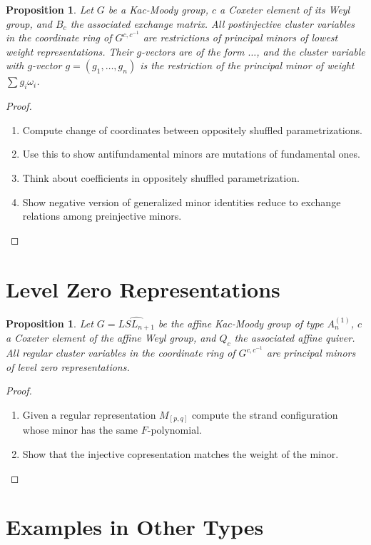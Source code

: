 \documentclass[11pt]{amsart}
\newtheorem{proposition}[theorem]{Proposition}
\begin{document}
\begin{proposition}
Let $G$ be a Kac-Moody group, $c$ a Coxeter element of its Weyl group, and $B_c$ the associated exchange matrix.  All postinjective cluster variables in the coordinate ring of $G^{c,c^{-1}}$ are restrictions of principal minors of lowest weight representations.  Their $g$-vectors are of the form $\dotsc$, and the cluster variable with $g$-vector $g = (g_1,\dotsc,g_n)$ is the restriction of the principal minor of weight $\sum g_i \omega_i$.
\end{proposition}
\begin{proof}
\begin{enumerate}
\item Compute change of coordinates between oppositely shuffled parametrizations.
\item Use this to show antifundamental minors are mutations of fundamental ones.
\item Think about coefficients in oppositely shuffled parametrization.
\item Show negative version of generalized minor identities reduce to exchange relations among preinjective minors.
\end{enumerate}
\end{proof}

\section{Level Zero Representations}

\begin{proposition}
Let $G = \widehat{LSL_{n+1}}$ be the affine Kac-Moody group of type $A_n^{(1)}$, $c$ a Coxeter element of the affine Weyl group, and $Q_c$ the associated affine quiver.  All regular cluster variables in the coordinate ring of $G^{c,c^{-1}}$ are principal minors of level zero representations.  
\end{proposition}
\begin{proof}
\begin{enumerate}
\item Given a regular representation $M_{[p,q]}$ compute the strand configuration whose minor has the same $F$-polynomial.
\item Show that the injective copresentation matches the weight of the minor.
\end{enumerate}
\end{proof}

\section{Examples in Other Types}
\end{document}
